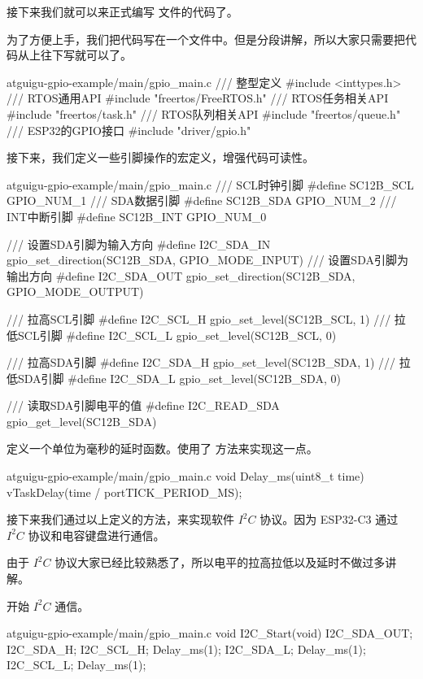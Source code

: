 \documentclass[lang=cn,newtx,10pt,scheme=chinese]{elegantbook}
\begin{document}
接下来我们就可以来正式编写  文件的代码了。

为了方便上手，我们把代码写在一个文件中。但是分段讲解，所以大家只需要把代码从上往下写就可以了。

\begin{mycode}{atguigu-gpio-example/main/gpio\_main.c}
/// 整型定义
#include <inttypes.h>
/// RTOS通用API
#include "freertos/FreeRTOS.h"
/// RTOS任务相关API
#include "freertos/task.h"
/// RTOS队列相关API
#include "freertos/queue.h"
/// ESP32的GPIO接口
#include "driver/gpio.h"
\end{mycode}

接下来，我们定义一些引脚操作的宏定义，增强代码可读性。

\begin{mycode}{atguigu-gpio-example/main/gpio\_main.c}
/// SCL时钟引脚
#define SC12B_SCL GPIO_NUM_1
/// SDA数据引脚
#define SC12B_SDA GPIO_NUM_2
/// INT中断引脚
#define SC12B_INT GPIO_NUM_0

/// 设置SDA引脚为输入方向
#define I2C_SDA_IN gpio_set_direction(SC12B_SDA, GPIO_MODE_INPUT)
/// 设置SDA引脚为输出方向
#define I2C_SDA_OUT gpio_set_direction(SC12B_SDA, GPIO_MODE_OUTPUT)

/// 拉高SCL引脚
#define I2C_SCL_H gpio_set_level(SC12B_SCL, 1)
/// 拉低SCL引脚
#define I2C_SCL_L gpio_set_level(SC12B_SCL, 0)

/// 拉高SDA引脚
#define I2C_SDA_H gpio_set_level(SC12B_SDA, 1)
/// 拉低SDA引脚
#define I2C_SDA_L gpio_set_level(SC12B_SDA, 0)

/// 读取SDA引脚电平的值
#define I2C_READ_SDA gpio_get_level(SC12B_SDA)
\end{mycode}

定义一个单位为毫秒的延时函数。使用了  方法来实现这一点。

\begin{mycode}{atguigu-gpio-example/main/gpio\_main.c}
void Delay_ms(uint8_t time)
{
    vTaskDelay(time / portTICK_PERIOD_MS);
}
\end{mycode}

接下来我们通过以上定义的方法，来实现软件 $I^2C$ 协议。因为 ESP32-C3 通过 $I^2C$ 协议和电容键盘进行通信。

由于 $I^2C$ 协议大家已经比较熟悉了，所以电平的拉高拉低以及延时不做过多讲解。

开始 $I^2C$ 通信。

\begin{mycode}{atguigu-gpio-example/main/gpio\_main.c}
void I2C_Start(void)
{
    I2C_SDA_OUT;
    I2C_SDA_H;
    I2C_SCL_H;
    Delay_ms(1);
    I2C_SDA_L;
    Delay_ms(1);
    I2C_SCL_L;
    Delay_ms(1);
}
\end{mycode}
\end{document}
